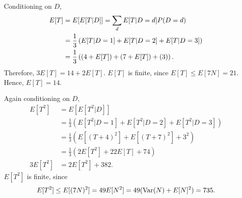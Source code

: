 \documentclass{article}
\DeclareMathOperator{\Var}{Var}
\begin{document}
\begin{enumerate}
    Conditioning on $D$,
    \begin{equation*}\begin{split}
    E[T]    & = E[E[T|D]] = \sum_d E[T|D=d]P(D=d) \\
            & = \frac{1}{3}\left( E[T|D=1] + E[T|D=2] + E[T|D=3] \right) \\
            & = \frac{1}{3}\left( (4+E[T]) + (7+E[T]) + (3) \right) \text. \\
    \end{split}\end{equation*}
    Therefore, $3E[T] = 14 + 2E[T]$.
    $E[T]$ is finite, since $ E[T] \leq E[7N] = 21 $.
    Hence, $E[T]=14$.

    Again conditioning on $D$,
    \[\begin{split}
    E[T^2]  & = E[E[T^2|D]] \\
            & = \frac{1}{3}\left( E[T^2|D=1] + E[T^2|D=2] + E[T^2|D=3] \right) \\
            & = \frac{1}{3}\left( E[(T+4)^2] + E[(T+7)^2] + 3^2 \right) \\
            & = \frac{1}{3}\left( 2E[T^2] + 22E[T] + 74 \right) \\
    3E[T^2] & = 2E[T^2] + 382\text{.}
    \end{split}\]
    $E[T^2]$ is finite, since $$E[T^2] \leq E[(7N)^2] = 49E[N^2] = 49(\Var(N)+E[N]^2) = 735\text.$$


\end{enumerate}
\end{document}
